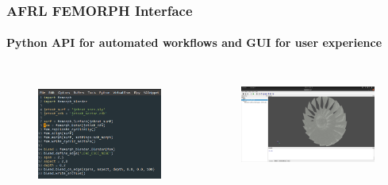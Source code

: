 \documentclass[t]{beamer}
\begin{document}
\begin{frame}
  \frametitle{AFRL FEMORPH Interface}
  \framesubtitle{Python API for automated workflows and GUI for user experience}

 \begin{columns}
    \begin{column}{0.5\textwidth}
      
        \begin{figure}
          \includegraphics[height=1.5in]{./figures/script.png}
          
        \end{figure}

    \end{column}
    \begin{column}{0.5\textwidth}

      \begin{figure}
       \includegraphics[height=1.25in]{./figures/GUI.png}
      \end{figure}
      
    \end{column}
  \end{columns}

\end{frame}
 
\end{document}

